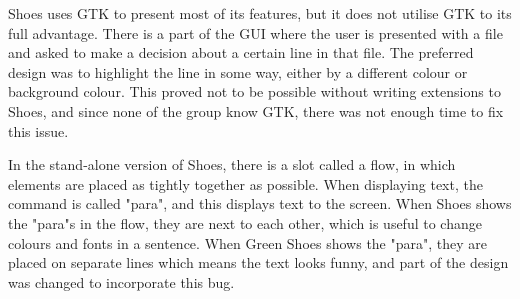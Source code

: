     Shoes uses GTK to present most of its features, but it does not utilise GTK to its full advantage. There is a part of the GUI where the user is presented with a file and asked to make a decision about a certain line in that file. The preferred design was to highlight the line in some way, either by a different colour or background colour. This proved not to be possible without writing extensions to Shoes, and since none of the group know GTK, there was not enough time to fix this issue.
    
    In the stand-alone version of Shoes, there is a slot called a flow, in which elements are placed as tightly together as possible. When displaying text, the command is called "para", and this displays text to the screen. When Shoes shows the "para"s in the flow, they are next to each other, which is useful to change colours and fonts in a sentence. When Green Shoes shows the "para", they are placed on separate lines which means the text looks funny, and part of the design was changed to incorporate this bug.
